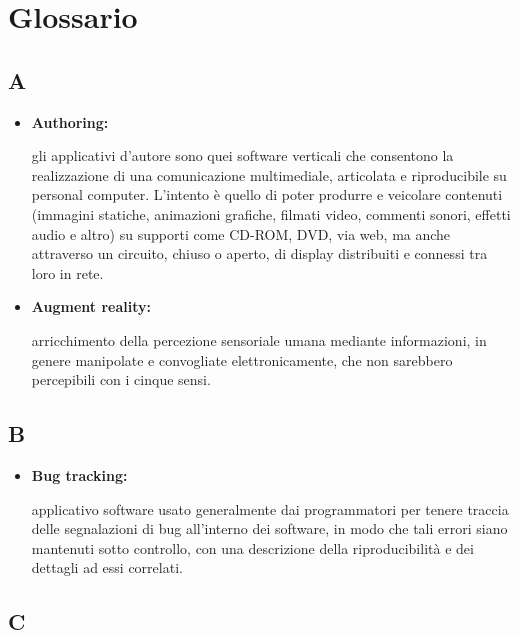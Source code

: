 \appendix
\newpage
\chapter{Glossario}

\section*{A}

\begin{itemize}
	\item \hypertarget{auth}{\textbf{Authoring:}} gli applicativi d'autore sono quei software verticali che consentono la realizzazione di una comunicazione multimediale, articolata e riproducibile su personal computer. L'intento è quello di poter produrre e veicolare contenuti (immagini statiche, animazioni grafiche, filmati video, commenti sonori, effetti audio e altro) su supporti come CD-ROM, DVD, via web, ma anche attraverso un circuito, chiuso o aperto, di display distribuiti e connessi tra loro in rete.
\end{itemize}

\begin{itemize}
	\item \hypertarget{ar}{\textbf{Augment reality:}} arricchimento della percezione sensoriale umana mediante informazioni, in genere manipolate e convogliate elettronicamente, che non sarebbero percepibili con i cinque sensi.
\end{itemize}

\section*{B}

\begin{itemize}
	\item \hypertarget{bg}{\textbf{Bug tracking:}} applicativo software usato generalmente dai programmatori per tenere traccia delle segnalazioni di bug all'interno dei software, in modo che tali errori siano mantenuti sotto controllo, con una descrizione della riproducibilità e dei dettagli ad essi correlati.
\end{itemize}

\section*{C}

